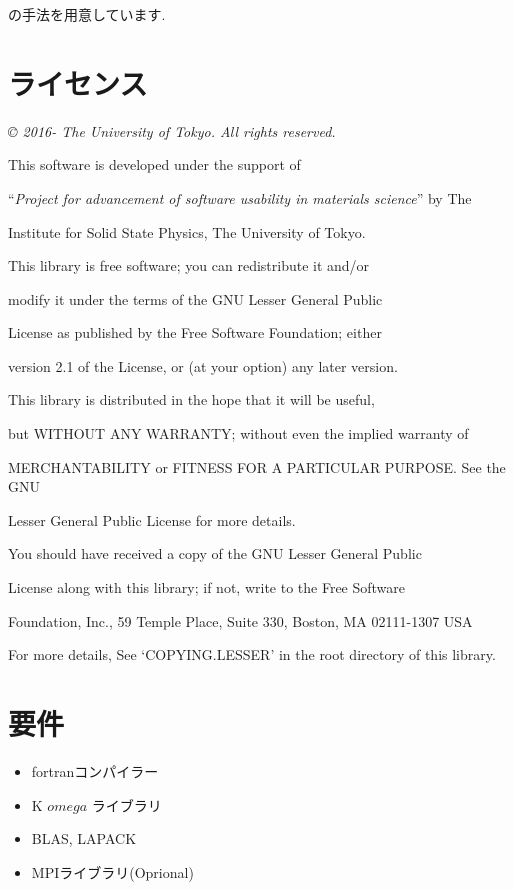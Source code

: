 \documentclass[letterpaper,10pt,dvipdfmx,openany]{sphinxmanual}
\begin{document}
の手法を用意しています.


\chapter{ライセンス}
\label{shiftk_copy_ja::doc}\label{shiftk_copy_ja:id1}
\emph{© 2016- The University of Tokyo. All rights reserved.}

\begin{DUlineblock}{0em}
\item[] This software is developed under the support of
\item[] ``\emph{Project for advancement of software usability in materials science}'' by The
\item[] Institute for Solid State Physics, The University of Tokyo.
\item[] 
\item[] This library is free software; you can redistribute it and/or
\item[] modify it under the terms of the GNU Lesser General Public
\item[] License as published by the Free Software Foundation; either
\item[] version 2.1 of the License, or (at your option) any later version.
\item[] This library is distributed in the hope that it will be useful,
\item[] but WITHOUT ANY WARRANTY; without even the implied warranty of
\item[] MERCHANTABILITY or FITNESS FOR A PARTICULAR PURPOSE. See the GNU
\item[] Lesser General Public License for more details.
\item[] 
\item[] You should have received a copy of the GNU Lesser General Public
\item[] License along with this library; if not, write to the Free Software
\item[] Foundation, Inc., 59 Temple Place, Suite 330, Boston, MA 02111-1307 USA
\item[] 
\item[] For more details, See ‘COPYING.LESSER’ in the root directory of this library.
\end{DUlineblock}


\chapter{要件}
\label{shiftk_env_ja::doc}\label{shiftk_env_ja:id1}\begin{itemize}
\item {} 
fortranコンパイラー

\item {} 
K \(omega\) ライブラリ

\item {} 
BLAS, LAPACK

\item {} 
MPIライブラリ(Oprional)

\end{itemize}
\end{document}
